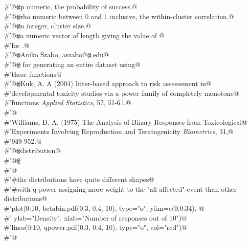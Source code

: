 \documentclass[reqno]{amsart}
\begin{document}
\begin{flushleft}
\begin{minipage}{\linewidth}
\begin{list}{}{}
\mbox{}\verb@#'@{\tt @}\verb@param p numeric, the probability of success.@\\
\mbox{}\verb@#'@{\tt @}\verb@param rho numeric between 0 and 1 inclusive, the within-cluster correlation.@\\
\mbox{}\verb@#'@{\tt @}\verb@param n integer, cluster size.@\\
\mbox{}\verb@#'@{\tt @}\verb@return a numeric vector of length  giving the value of @\\
\mbox{}\verb@#'for .@\\
\mbox{}\verb@#'@{\tt @}\verb@author Aniko Szabo, aszabo@{\tt @}\verb@mcw.edu@\\
\mbox{}\verb@#'@{\tt @}\verb@seealso {} for generating an entire dataset using@\\
\mbox{}\verb@#'these functions@\\
\mbox{}\verb@#'@{\tt @}\verb@references Kuk, A. A (2004) litter-based approach to risk assessement in@\\
\mbox{}\verb@#'developmental toxicity studies via a power family of completely monotone@\\
\mbox{}\verb@#'functions \emph{Applied Statistics}, 52, 51-61.@\\
\mbox{}\verb@#'@\\
\mbox{}\verb@#'Williams, D. A. (1975) The Analysis of Binary Responses from Toxicological@\\
\mbox{}\verb@#'Experiments Involving Reproduction and Teratogenicity \emph{Biometrics}, 31,@\\
\mbox{}\verb@#'949-952.@\\
\mbox{}\verb@#'@{\tt @}\verb@keywords distribution@\\
\mbox{}\verb@#'@{\tt @}\verb@examples@\\
\mbox{}\verb@#'@\\
\mbox{}\verb@#'#the distributions have quite different shapes@\\
\mbox{}\verb@#'#with q-power assigning more weight to the "all affected" event than other distributions@\\
\mbox{}\verb@#'plot(0:10, betabin.pdf(0.3, 0.4, 10), type="o", ylim=c(0,0.34), @\\
\mbox{}\verb@#'   ylab="Density", xlab="Number of responses out of 10")@\\
\mbox{}\verb@#'lines(0:10, qpower.pdf(0.3, 0.4, 10), type="o", col="red")@\\
\mbox{}\verb@#'@\\

\end{list}
\end{minipage}
\end{flushleft}
\end{document}
